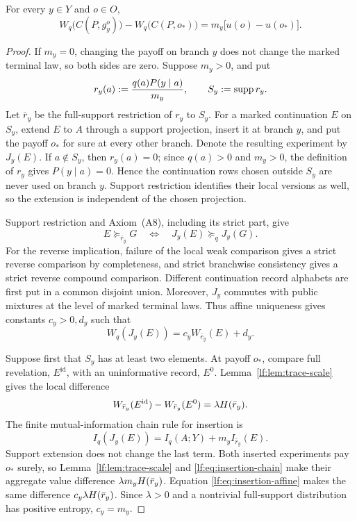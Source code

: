 \begin{lemma}\label{lf:lem:branch-increment}
For every $y\in Y$ and $o\in O$,
\begin{equation}
W_q\bigl(C(P,g_y^o)\bigr)
-W_q\bigl(C(P,o_\ast)\bigr)=m_y\bigl[u(o)-u(o_\ast)\bigr].
\label{lf:eq:branch-increment}
\end{equation}
\end{lemma}

\begin{proof}
If $m_y=0$, changing the payoff on branch $y$ does not change the marked
terminal law, so both sides are zero.  Suppose $m_y>0$, and put
\[
r_y(a):=\frac{q(a)P(y\mid a)}{m_y},
\qquad
S_y:=\operatorname{supp} r_y.
\]
Let $\bar r_y$ be the full-support restriction of $r_y$ to $S_y$.  For a
marked continuation $E$ on $S_y$, extend $E$ to $A$ through a support
projection, insert it at branch $y$, and put the payoff $o_\ast$ for sure at
every other branch.  Denote the resulting experiment by $J_y(E)$.  If
$a\notin S_y$, then $r_y(a)=0$; since $q(a)>0$ and $m_y>0$, the definition of
$r_y$ gives $P(y\mid a)=0$.  Hence the continuation rows chosen outside $S_y$
are never used on branch $y$.  Support restriction identifies their local
versions as well, so the extension is independent of the chosen projection.

Support restriction and Axiom~\textup{(A8)}, including its strict part, give
\[
E\succeq_{\bar r_y}G
\quad\Longleftrightarrow\quad
J_y(E)\succeq_q J_y(G).
\]
For the reverse implication, failure of the local weak comparison gives a
strict reverse comparison by completeness, and strict branchwise consistency
gives a strict reverse compound comparison.  Different continuation record
alphabets are first put in a common disjoint union.  Moreover, $J_y$ commutes
with public mixtures at the level of marked terminal laws.  Thus affine
uniqueness gives constants $c_y>0,d_y$ such that
\begin{equation}
W_q(J_y(E))=c_y W_{\bar r_y}(E)+d_y.
\label{lf:eq:insertion-affine}
\end{equation}

Suppose first that $S_y$ has at least two elements.  At payoff $o_\ast$, compare
full revelation, $E^{\mathrm{id}}$, with an uninformative record, $E^0$.
Lemma~\ref{lf:lem:trace-scale} gives the local difference
\[
W_{\bar r_y}(E^{\mathrm{id}})-W_{\bar r_y}(E^0)
=\lambda H(\bar r_y).
\]
The finite mutual-information chain rule for insertion is
\begin{equation}
I_q(J_y(E))=I_q(A;Y)+m_y I_{\bar r_y}(E).
\label{lf:eq:insertion-chain}
\end{equation}
Support extension does not change the last term.  Both inserted experiments
pay $o_\ast$ surely, so Lemma~\ref{lf:lem:trace-scale} and
\eqref{lf:eq:insertion-chain} make their aggregate value difference
$\lambda m_yH(\bar r_y)$.  Equation
\eqref{lf:eq:insertion-affine} makes the same difference
$c_y\lambda H(\bar r_y)$.  Since $\lambda>0$ and a nontrivial full-support
distribution has positive entropy, $c_y=m_y$.


\end{proof}
